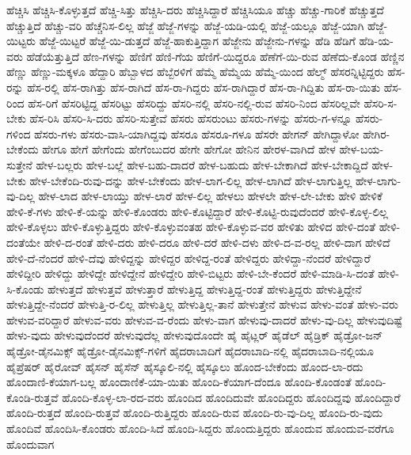 {ಹೆಚ್ಚಿಸಿ
ಹೆಚ್ಚಿಸಿ-ಕೊಳ್ಳುತ್ತದೆ
ಹೆಚ್ಚಿ-ಸಿತ್ತು
ಹೆಚ್ಚಿಸಿ-ದರು
ಹೆಚ್ಚಿಸಿದ್ದಾರೆ
ಹೆಚ್ಚಿಸಿಯೂ
ಹೆಚ್ಚು
ಹೆಚ್ಚು-ಗಾರಿಕೆ
ಹೆಚ್ಚುತ್ತದೆ
ಹೆಚ್ಚುತ್ತಿದೆ
ಹೆಚ್ಚು-ವರಿ
ಹೆಚ್ಚೆನಿಸ-ಲಿಲ್ಲ
ಹೆಜ್ಜೆ
ಹೆಜ್ಜೆ-ಗಳನ್ನು
ಹೆಜ್ಜೆ-ಯಡಿ-ಯಲ್ಲಿ
ಹೆಜ್ಜೆ-ಯಲ್ಲೂ
ಹೆಜ್ಜೆ-ಯಾಗಿ
ಹೆಜ್ಜೆ-ಯಿಟ್ಟರು
ಹೆಜ್ಜೆ-ಯಿಟ್ಟರೆ
ಹೆಜ್ಜೆ-ಯಿ-ಡುತ್ತದೆ
ಹೆಜ್ಜೆ-ಹಾಕುತ್ತಿದ್ದಾಗ
ಹೆಜ್ಜೇನು
ಹೆಜ್ಜೇನು-ಗಳನ್ನು
ಹೆಡಿ
ಹೆಡಿಗೆ
ಹೆಡಿ-ಯ-ವರು
ಹೆಡೆಯೆತ್ತುತ್ತಿದೆ
ಹೆಣ-ಗಳನ್ನು
ಹೆಣಿಗೆ
ಹೆಣಿ-ಗೆಯ
ಹೆಣಿಗೆ-ಯಿದ್ದರೂ
ಹೆಣೆಗೆ-ಯಿ-ರುವ
ಹೆಣೆದು-ಕೊಂಡ
ಹೆಣ್ಣಿನ
ಹೆಣ್ಣು
ಹೆಣ್ಣು-ಮಕ್ಕಳೂ
ಹೆದ್ದಾರಿ
ಹೆಬ್ಬಾಳದ
ಹೆಬ್ಬೆರಳಿಗೆ
ಹೆಮ್ಮೆ
ಹೆಮ್ಮೆಯ
ಹೆಮ್ಮೆ-ಯಿಂದ
ಹೆಲ್ಮ್
ಹೆಸರನ್ನಿಟ್ಟಿದ್ದರು
ಹೆಸ-ರನ್ನು
ಹೆಸ-ರಲ್ಲಿ
ಹೆಸ-ರಾಗಿತ್ತು
ಹೆಸ-ರಾಗಿದೆ
ಹೆಸ-ರಾ-ಗಿದ್ದರು
ಹೆಸ-ರಾಗಿದ್ದಾರೆ
ಹೆಸ-ರಾ-ಗಿದ್ದಿತು
ಹೆಸ-ರಾ-ಯಿತು
ಹೆಸ-ರಿಂದ
ಹೆಸ-ರಿಗೆ
ಹೆಸರಿಟ್ಟಿದ್ದ
ಹೆಸರಿಟ್ಟು
ಹೆಸರಿದ್ದು
ಹೆಸರಿ-ನಲ್ಲಿ
ಹೆಸರಿ-ನಲ್ಲಿ-ರುವ
ಹೆಸರಿ-ನಿಂದ
ಹೆಸರಿಲ್ಲವೇ
ಹೆಸರಿ-ಸ-ಬೇಕು
ಹೆಸ-ರಿಸಿ
ಹೆಸರಿ-ಸಿ-ದರು
ಹೆಸರಿ-ಸುತ್ತೇವೆ
ಹೆಸರು
ಹೆಸರುಂಟು
ಹೆಸರು-ಗಳನ್ನು
ಹೆಸರು-ಗ-ಳನ್ನೂ
ಹೆಸರು-ಗಳಿಂದ
ಹೆಸರು-ಗಳು
ಹೆಸರು-ವಾಸಿ-ಯಾಗಿದ್ದವು
ಹೆಸರೂ
ಹೆಸರೂ-ಗಳೂ
ಹೆಸರೇ
ಹೇಗನ್
ಹೇಗಿದ್ದಾಳೋ
ಹೇಗಿರ-ಬೇಕೆಂದು
ಹೇಗೂ
ಹೇಗೆ
ಹೇಗೆಂದು
ಹೇಗೆಂಬುದರ
ಹೇಗೇ
ಹೇಗೋ
ಹೇನಿನ
ಹೇರಳ-ವಾಗಿದೆ
ಹೇಳ
ಹೇಳ-ಬಯ-ಸುತ್ತೇನೆ
ಹೇಳ-ಬಲ್ಲರು
ಹೇಳ-ಬಲ್ಲೆ
ಹೇಳ-ಬಹು-ದಾದರೆ
ಹೇಳ-ಬಹುದು
ಹೇಳ-ಬೇಕಾಗಿದೆ
ಹೇಳ-ಬೇಕಾದ್ದಿದೆ
ಹೇಳ-ಬೇಕು
ಹೇಳ-ಬೇಕೆಂದಿ-ರುವು-ದನ್ನು
ಹೇಳ-ಬೇಕೆಂದು
ಹೇಳ-ಲಾಗ-ಲಿಲ್ಲ
ಹೇಳ-ಲಾಗಿದೆ
ಹೇಳ-ಲಾಗುತ್ತಿಲ್ಲ
ಹೇಳ-ಲಾಗು-ವು-ದಿಲ್ಲ
ಹೇಳ-ಲಾದ
ಹೇಳ-ಲಾಯ್ತು
ಹೇಳ-ಲಾರೆ
ಹೇಳ-ಲಿಲ್ಲ
ಹೇಳಲು
ಹೇಳಲೇ
ಹೇಳ-ಲೇ-ಬೇಕು
ಹೇಳಿ
ಹೇಳಿಕೆ
ಹೇಳಿ-ಕೆ-ಗಳು
ಹೇಳಿ-ಕೆ-ಯನ್ನು
ಹೇಳಿ-ಕೊಂಡರು
ಹೇಳಿ-ಕೊಟ್ಟಿದ್ದಾರೆ
ಹೇಳಿ-ಕೊಟ್ಟಿ-ರುವುದೆಂದರೆ
ಹೇಳಿ-ಕೊಳ್ಳ-ಲಿಲ್ಲ
ಹೇಳಿ-ಕೊಳ್ಳಲು
ಹೇಳಿ-ಕೊಳ್ಳುತ್ತಿದ್ದರು
ಹೇಳಿ-ಕೊಳ್ಳುವಂತಹ
ಹೇಳಿ-ಕೊಳ್ಳುವ-ವರ
ಹೇಳಿತು
ಹೇಳಿದ
ಹೇಳಿ-ದಂತೆ
ಹೇಳಿ-ದಂತೆಯೇ
ಹೇಳಿ-ದ-ರಂತೆ
ಹೇಳಿ-ದರು
ಹೇಳಿ-ದರೂ
ಹೇಳಿ-ದರೆ
ಹೇಳಿ-ದಳು
ಹೇಳಿ-ದ-ವ-ರಲ್ಲ
ಹೇಳಿ-ದಾಗ
ಹೇಳಿದೆ
ಹೇಳಿ-ದೆ-ನೆಂದರೆ
ಹೇಳಿ-ದೆವು
ಹೇಳಿದ್ದನ್ನು
ಹೇಳಿದ್ದರ
ಹೇಳಿದ್ದ-ರಂತೆ
ಹೇಳಿದ್ದರು
ಹೇಳಿದ್ದಾ-ನೆಂದರೆ
ಹೇಳಿದ್ದಾರೆ
ಹೇಳಿದ್ದೀರಿ
ಹೇಳಿದ್ದು
ಹೇಳಿದ್ದೇ
ಹೇಳಿದ್ದೇನೆ
ಹೇಳಿದ್ದೇರಿ
ಹೇಳಿ-ಬಿಟ್ಟರು
ಹೇಳಿ-ಬೇ-ಕೆಂದರೆ
ಹೇಳಿ-ಮಾಡಿ-ಸಿ-ದಂತೆ
ಹೇಳಿ-ಸಿ-ಕೊಂಡು
ಹೇಳುತ್ತದೆ
ಹೇಳುತ್ತವೆ
ಹೇಳುತ್ತಾರೆ
ಹೇಳುತ್ತಿದ್ದ
ಹೇಳುತ್ತಿದ್ದ-ರಂತೆ
ಹೇಳುತ್ತಿದ್ದರು
ಹೇಳುತ್ತಿದ್ದೇನೆ
ಹೇಳುತ್ತಿದ್ದೇ-ನೆಂದರೆ
ಹೇಳುತ್ತಿ-ರ-ಲಿಲ್ಲ
ಹೇಳುತ್ತಿಲ್ಲ
ಹೇಳುತ್ತಿಲ್ಲ-ತಾನೆ
ಹೇಳುತ್ತೇನೆ
ಹೇಳುವ
ಹೇಳು-ವಂತೆ
ಹೇಳು-ವರು
ಹೇಳುವ-ವರಿದ್ದಾರೆ
ಹೇಳುವ-ವರು
ಹೇಳುವ-ವ-ರೆಂದು
ಹೇಳು-ವಾಗ
ಹೇಳುವು-ದಾದರೆ
ಹೇಳು-ವು-ದಿಲ್ಲ
ಹೇಳುವುದಿಷ್ಟೆ
ಹೇಳು-ವುದು
ಹೇಳುವುದೆಂದರೆ
ಹೇಳುವುದೆಲ್ಲ
ಹೇಳುವುದೊಂದೇ
ಹೈ
ಹೈಟ್ಲರ್
ಹೈಡೆಲ್
ಹೈಡ್ರಿಕ್
ಹೈಡ್ರೋ-ಜನ್
ಹೈಡ್ರೋ-ಡೈನಮಿಕ್ಸ್
ಹೈಡ್ರೋ-ಡೈನಮಿಕ್ಸ್-ಗಳಿಗೆ
ಹೈದರಾಬಾದಿಗೆ
ಹೈದರಾಬಾದಿ-ನಲ್ಲಿ
ಹೈದರಾಬಾದಿ-ನಲ್ಲಿಯೂ
ಹೈಪ್ರೆಷರ್
ಹೈರೋವ್
ಹೈಸನ್
ಹೈಸೆನ್
ಹೈಸ್ಕೂಲಿ-ನಲ್ಲಿ
ಹೈಸ್ಕೂಲು
ಹೊಂದ-ಬೇಕೆಂದು
ಹೊಂದ-ಲಾ-ರದು
ಹೊಂದಾಣಿ-ಕೆಯಾಗ-ಬಲ್ಲ
ಹೊಂದಾಣಿಕೆ-ಯಾ-ಯಿತು
ಹೊಂದಿ-ಕೆಯಾಗ-ದೆಂದೂ
ಹೊಂದಿ-ಕೊಂಡಂತೆ
ಹೊಂದಿ-ಕೊಂಡಿ-ರುತ್ತವೆ
ಹೊಂದಿ-ಕೊಳ್ಳ-ಲಾ-ರದ-ವರು
ಹೊಂದಿದ
ಹೊಂದಿದುವೇ
ಹೊಂದಿದ್ದರು
ಹೊಂದಿದ್ದವು
ಹೊಂದಿದ್ದಾರೆ
ಹೊಂದಿ-ರುತ್ತದೆ
ಹೊಂದಿ-ರುತ್ತವೆ
ಹೊಂದಿ-ರುತ್ತಿದ್ದರು
ಹೊಂದಿ-ರುವ
ಹೊಂದಿ-ರು-ವು-ದಿಲ್ಲ
ಹೊಂದಿ-ರು-ವುದು
ಹೊಂದಿವೆ
ಹೊಂದಿಸಿ-ಕೊಂಡರು
ಹೊಂದಿ-ಸಿದೆ
ಹೊಂದಿ-ಸಿದ್ದರು
ಹೊಂದುತ್ತಿದ್ದರು
ಹೊಂದುವ
ಹೊಂದುವ-ವರೆಗೂ
ಹೊಂದುವಾಗ
}
